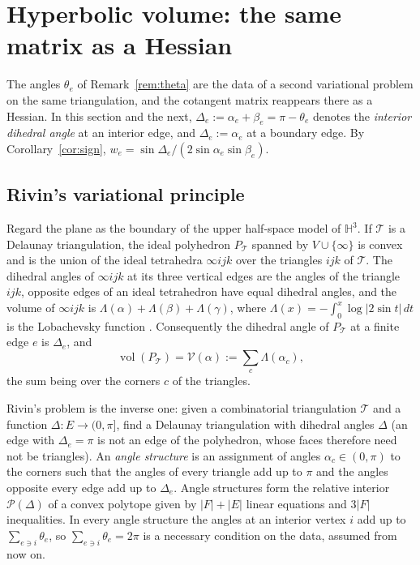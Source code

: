 \documentclass[11pt]{amsart}
\theoremstyle{definition}
\theoremstyle{remark}
\newcommand{\cT}{\mathcal{T}}
\begin{document}
\section{Hyperbolic volume: the same matrix as a Hessian}\label{sec:volume}

The angles $\theta_e$ of Remark~\ref{rem:theta} are the data of a second variational problem on the same triangulation, and the cotangent matrix reappears there as a Hessian.
In this section and the next, $\Delta_e:=\alpha_e+\beta_e=\pi-\theta_e$ denotes the \emph{interior dihedral angle} at an interior edge, and $\Delta_e:=\alpha_e$ at a boundary edge.
By Corollary~\ref{cor:sign}, $w_e=\sin\Delta_e/(2\sin\alpha_e\sin\beta_e)$.

\subsection{Rivin's variational principle}
Regard the plane as the boundary of the upper half-space model of $\mathbb H^3$. If $\cT$ is a Delaunay triangulation, the ideal polyhedron $P_\cT$ spanned by $V\cup\{\infty\}$ is convex and is the union of the ideal tetrahedra $\infty ijk$
over the triangles $ijk$ of $\cT$. The dihedral angles of $\infty ijk$ at its three vertical edges are the angles of the triangle $ijk$, opposite edges of an ideal tetrahedron have equal dihedral angles, and the volume of $\infty ijk$ is
$\Lambda(\alpha)+\Lambda(\beta)+\Lambda(\gamma)$, where $\Lambda(x)=-\int_0^x\log|2\sin t|\,dt$ is the Lobachevsky function \cite{Mil82}. Consequently the dihedral angle of $P_\cT$ at a finite edge $e$ is $\Delta_e$, and
\[
\operatorname{vol}(P_\cT)=\mathcal V(\alpha):=\sum_{c}\Lambda(\alpha_c),
\]
the sum being over the corners $c$ of the triangles.

Rivin's problem \cite{Riv94,Riv96} is the inverse one: given a combinatorial triangulation $\cT$ and a function $\Delta\colon E\to(0,\pi]$, find a Delaunay triangulation with dihedral angles $\Delta$
(an edge with $\Delta_e=\pi$ is not an edge of the polyhedron, whose faces therefore need not be triangles).
An \emph{angle structure} is an assignment of angles $\alpha_c\in(0,\pi)$ to the corners such that the angles of every triangle add up to $\pi$ and the angles opposite every edge add up to $\Delta_e$.
Angle structures form the relative interior $\mathcal P(\Delta)$ of a convex polytope given by $|F|+|E|$ linear equations and $3|F|$ inequalities. In every angle structure the angles at an interior vertex $i$ add up to $\sum_{e\ni i}\theta_e$,
so $\sum_{e\ni i}\theta_e=2\pi$ is a necessary condition on the data, assumed from now on.
\end{document}
